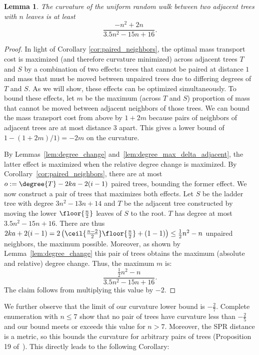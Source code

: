 \documentclass[11pt,onecolumn,conference]{IEEEtran}
\newtheorem{lemma}[theorem]{Lemma}
\begin{document}
\begin{lemma}
	The curvature of the uniform random walk between two adjacent trees with $n$ leaves is at least
	$$\frac{-n^2 + 2n}{3.5n^2 - 15n + 16}.$$
\end{lemma}
\begin{proof}
    In light of Corollary \ref{cor:paired_neighbors}, the optimal mass transport cost is maximized (and therefore curvature minimized) across adjacent trees $T$ and $S$ by a combination of two effects: trees that cannot be paired at distance $1$ and mass that must be moved between unpaired trees due to differing degrees of $T$ and $S$.
		As we will show, these effects can be optimized simultaneously.
    To bound these effects, let $m$ be the maximum (across $T$ and $S$) proportion of mass that cannot be moved between adjacent neighbors of those trees.
    We can bound the mass transport cost from above by $1 + 2m$ because pairs of neighbors of adjacent trees are at most distance 3 apart.
	This gives a lower bound of $1 - (1 + 2m) / 1) = -2m$ on the curvature.

	By Lemmas~\ref{lem:degree_change} and~\ref{lem:degree_max_delta_adjacent}, the latter effect is maximized when the relative degree change is maximized.
	By Corollary~\ref{cor:paired_neighbors}, there are at most $o := \degree{T} -2ka - 2(i-1)$ paired trees, bounding the former effect.
	We now construct a pair of trees that maximizes both effects.
	Let $S$ be the ladder tree with degree $3n^2 - 13n + 14$ and $T$ be the adjacent tree constructed by moving the lower $\floor{\frac{n}{2}}$ leaves of $S$ to the root.
	$T$ has degree at most $3.5n^2 -15n + 16$.
	There are thus $2ka + 2(i-1) = 2\left(\ceil{\frac{n-2}{2}}\floor{\frac{n}{2}} +(1-1)\right) \le \frac{1}{2}n^2 - n$ unpaired neighbors, the maximum possible.
	Moreover, as shown by Lemma~\ref{lem:degree_change} this pair of trees obtains the maximum (absolute and relative) degree change.
	Thus, the maximum $m$ is:
	$$\frac{\frac{1}{2}n^2 - n}{3.5n^2 - 15n + 16}.$$
	The claim follows from multiplying this value by $-2$.
\end{proof}

We further observe that the limit of our curvature lower bound is $-\frac{2}{7}$.
Complete enumeration with $n \le 7$ show that no pair of trees have curvature less than $-\frac{2}{5}$ and our bound meets or exceeds this value for $n > 7$.
Moreover, the SPR distance is a metric, so this bounds the curvature for arbitrary pairs of trees (Proposition 19 of~\cite{Ollivier2009-bw}).
This directly leads to the following Corollary:
\end{document}
